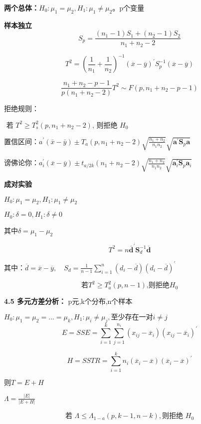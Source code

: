 \documentclass[10pt,a4paper]{ctexart} %
\begin{document}
\begin{multicols*}{3}
		\textbf{两个总体：}$H_0:\mu_1=\mu_2, H_1:\mu_1 \neq \mu_2$。p个变量
		
		\textbf{样本独立}
		$$S_p=\frac{(n_1-1)S_1+(n_2-1)S_2}{n_1+n_2-2}$$
		
		$$T^{2}=\left(\frac{1}{n_{1}}+\frac{1}{n_{2}}\right)^{-1}\left(\overline{x}-\overline{y}\right)^{\prime}S_{p}^{-1}\left(\overline{x}-\overline{y}\right)$$
		
		$$\frac{n_{1}+n_{2}-p-1}{p\left(n_{1}+n_{2}-2\right)} T^{2} \sim F\left(p, n_{1}+n_{2}-p-1\right)$$
		
		拒绝规则：
		
		$\text { 若 } T^{2} \geqslant T_{s}^{2}\left(p, n_{1}+n_{2}-2\right) \text {, 则拒绝 } H_{0}$
		
		置信区间：$a^{\prime}(\bar{x}-\bar{y})\pm T_a(p,n_1+n_2-2)\sqrt{\frac{n_1+n_2}{n_1n_2}}\sqrt{\boldsymbol{a}^{\prime}\boldsymbol{S}_p\boldsymbol{a}}$
		
		谤佛论你：$a_i^{\prime}(\overline{x}-\overline{y})\pm t_{a/2k}(n_1+n_2-2)\sqrt{\frac{n_1+n_2}{n_1n_2}}\sqrt{\boldsymbol{a}_i^{\prime}\boldsymbol{S}_p\boldsymbol{a}_i}$
		
		
		\textbf{成对实验}
		
		$H_0:\mu_1=\mu_2, H_1:\mu_1 \neq \mu_2$
		
		$H_0:\delta=0,H_1:\delta \neq 0$
		
		其中$\delta = \mu_1 - \mu_2$
		
		$$T^2=n\overline{\boldsymbol{d}}^{\prime}\boldsymbol{S}_d^{-1}\overline{\boldsymbol{d}}$$
		
		其中：$\overline{d}=\overline{x}-\overline{y},\quad S_d=\frac1{n-1}\sum_{i=1}^n\left(d_i-\overline{d}\right)\left(d_i-\overline{d}\right)^{\prime}$
		
		$$\text{若} T^2\geqslant T_a^2(p,n-1)\text{,则拒绝} H_0$$
		
		\textbf{4.5 多元方差分析：} p元,k个分布,n个样本
		
		$H_0:\mu_1=\mu_2=\dots=\mu_k, H_1:\mu_i \neq \mu_j,\text{至少存在一对}i \neq j$
		$$E=SSE=\sum_{i=1}^{k}\sum_{j=1}^{n_{i}}\left(x_{ij}-\overline{x}_{i}\right)\left(x_{ij}-\overline{x}_{i}\right)^{\prime}$$
		
		$$H=SSTR=\sum_{i=1}^{k}n_{i}\left(\overline{x}_{i}-\overline{x}\right)\left(\overline{x}_{i}-\overline{x}\right)^{\prime}$$
		
		$\text{则}T=E+H$
		
		$\Lambda=\frac{|E|}{|E+H|}$
		
		$$\text{若 }\Lambda\leqslant\Lambda_{1-a}(p,k-1,n-k),\text{则拒绝 }H_0$$
		

\end{multicols*}
\end{document}
